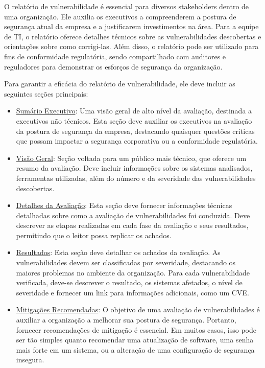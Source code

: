        O relatório de vulnerabilidade é essencial para diversos stakeholders dentro de uma organização. Ele auxilia os executivos a compreenderem a postura de segurança atual da empresa e a justificarem investimentos na área. Para a equipe de TI, o relatório oferece detalhes técnicos sobre as vulnerabilidades descobertas e orientações sobre como corrigi-las. Além disso, o relatório pode ser utilizado para fins de conformidade regulatória, sendo compartilhado com auditores e reguladores para demonstrar os esforços de segurança da organização.
        
        Para garantir a eficácia do relatório de vulnerabilidade, ele deve incluir as seguintes seções principais:

        \begin{itemize}
            \item \underline{Sumário Executivo}: Uma visão geral de alto nível da avaliação, destinada a executivos não técnicos. Esta seção deve auxiliar os executivos na avaliação da postura de segurança da empresa, destacando quaisquer questões críticas que possam impactar a segurança corporativa ou a conformidade regulatória.
            \item \underline{Visão Geral}: Seção voltada para um público mais técnico, que oferece um resumo da avaliação. Deve incluir informações sobre os sistemas analisados, ferramentas utilizadas, além do número e da severidade das vulnerabilidades descobertas.
            \item \underline{Detalhes da Avaliação}: Esta seção deve fornecer informações técnicas detalhadas sobre como a avaliação de vulnerabilidades foi conduzida. Deve descrever as etapas realizadas em cada fase da avaliação e seus resultados, permitindo que o leitor possa replicar os achados.
            \item \underline{Resultados}: Esta seção deve detalhar os achados da avaliação. As vulnerabilidades devem ser classificadas por severidade, destacando os maiores problemas no ambiente da organização. Para cada vulnerabilidade verificada, deve-se descrever o resultado, os sistemas afetados, o nível de severidade e fornecer um link para informações adicionais, como um CVE.
            \item \underline{Mitigações Recomendadas}: O objetivo de uma avaliação de vulnerabilidades é auxiliar a organização a melhorar sua postura de segurança. Portanto, fornecer recomendações de mitigação é essencial. Em muitos casos, isso pode ser tão simples quanto recomendar uma atualização de software, uma senha mais forte em um sistema, ou a alteração de uma configuração de segurança insegura.
        \end{itemize}

